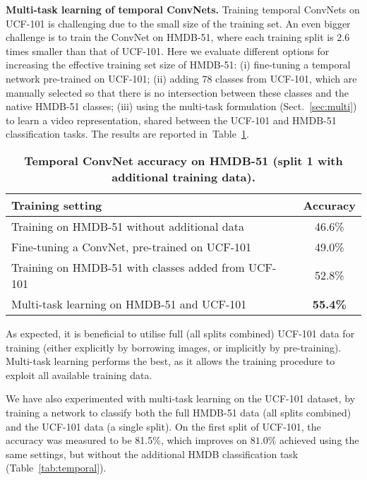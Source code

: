 \documentclass{article} \usepackage{nips14submit_e,times}
\newcommand{\tblref}[1]{Table~\ref{#1}}
\newcommand{\sref}[1]{Sect.~\ref{#1}}
\begin{document}
\noindent\textbf{Multi-task learning of temporal ConvNets.}
Training temporal ConvNets on UCF-101 is challenging due to the small size of the training set. An even bigger challenge is to train the ConvNet on HMDB-51, where
each training split is $2.6$ times smaller than that of UCF-101. Here we evaluate different options for increasing the effective training set size of HMDB-51:
(i) fine-tuning a temporal network pre-trained on UCF-101; 
(ii) adding $78$ classes from UCF-101, which are manually selected so that there is no intersection between
these classes and the native HMDB-51 classes; 
(iii) using the multi-task formulation (\sref{sec:multi}) to learn a video representation, shared between the UCF-101 and HMDB-51 classification
tasks. The results are reported in~\tblref{tab:hmdb_extra_data}. 
\begin{table}[ht]
\small
\centering
\caption{\textbf{Temporal ConvNet accuracy on HMDB-51 (split 1 with additional training data).}
}
\begin{tabular}{|l|c|} \hline
\multicolumn{1}{|l|}{Training setting} & Accuracy \\ \hline
Training on HMDB-51 without additional data & 46.6\%  \\ \hline
Fine-tuning a ConvNet, pre-trained on UCF-101 & 49.0\%  \\ \hline
Training on HMDB-51 with classes added from UCF-101 & 52.8\% \\ \hline
Multi-task learning on HMDB-51 and UCF-101 & \textbf{55.4\%} \\ \hline
\end{tabular}
\label{tab:hmdb_extra_data}
\end{table}
As expected, it is beneficial to utilise full (all splits combined) UCF-101 data for training (either explicitly by borrowing images, or implicitly by pre-training). 
Multi-task learning performs the best, as it allows the training procedure to exploit all available training data.

We have also experimented with multi-task learning on the UCF-101 dataset, by training a network to classify both the full HMDB-51 data (all splits combined) and
the UCF-101 data (a single split). On the first split of UCF-101, the accuracy was measured to be 81.5\%,
which improves on $81.0\%$ achieved using the same settings, but without the additional HMDB classification task (\tblref{tab:temporal}).
\end{document}
